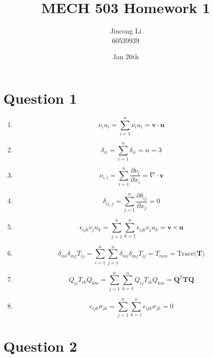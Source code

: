 \documentclass[a4paper,12pt]{article} %
\begin{document}
\newcommand{\vect}[1]{\mathbf{#1}}

\title{MECH 503 Homework 1}
\author{Jincong Li \\ 60539939}
\date{Jan 26th}
\maketitle

\section{\textbf{Question 1}}

\begin{enumerate}[label= (\alph*)]
    \item \[ \nu_i u_i = \sum_{i=1}^{n} \nu_i u_i  = \vect{v} \cdot \vect{u} \]
    
    \item \[ \delta_{ii} = \sum_{i=1}^{n} \delta_{ii} = n = 3 \]

    \item \[ \nu_{i,i} = \sum_{i=1}^{n} \frac{\partial \nu_i}{\partial x_i}  = \nabla \cdot \vect{v}\]

    \item \[ \delta_{ij,j} = \sum_{j=1}^{n} \frac{\partial \delta_{ij}}{\partial x_j} = 0\]

    \item \[ \epsilon_{ijk} v_j u_k = \sum_{j=1}^{n} \sum_{k=1}^{n} \epsilon_{ijk} v_j u_k  = \vect{v} \times  \vect{u} \]

    \item \[ \delta_{mi} \delta_{mj} T_{ij} = \sum_{i=1}^{n} \sum_{j=1}^{n} \delta_{mi} \delta_{mj} T_{ij} = T_{mm} = \text{Trace($\vect{T}$)}\]

    \item \[ Q_{ij} T_{ik} Q_{km} = \sum_{j=1}^{n} \sum_{k=1}^{n} Q_{ij} T_{ik} Q_{km} = {\vect{Q}}^T \vect{T}\vect{Q} \]

    \item \[ \epsilon_{ijk} \sigma_{jk} = \sum_{j=1}^{n} \sum_{k=1}^{n} \epsilon_{ijk} \sigma_{jk} =0 \]
\end{enumerate}

\section{\textbf{Question 2}}
\end{document}
